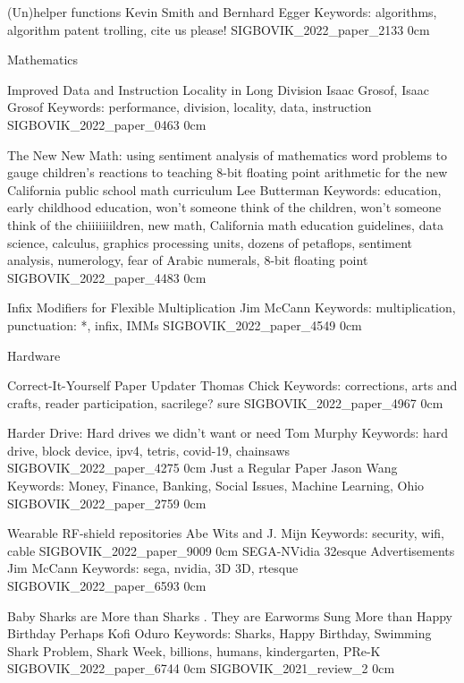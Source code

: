 \addpaper
    {(Un)helper functions}
    {Kevin Smith and Bernhard Egger}
    {Keywords: algorithms, algorithm patent trolling, cite us please!}
    {SIGBOVIK_2022_paper_2133}
    {0cm}
    {}

\addtrack
    {}{Mathematics}

\addpaper
    {Improved Data and Instruction Locality in Long Division}
    {Isaac Grosof, Isaac Grosof}
    {Keywords: performance, division, locality, data, instruction}
    {SIGBOVIK_2022_paper_0463}
    {0cm}
    {}

\addpaper
    {The New New Math: using sentiment analysis of mathematics word problems to gauge children's reactions to teaching 8-bit floating point arithmetic for the new California public school math curriculum}
    {Lee Butterman}
    {Keywords: education, early childhood education, won't someone think of the children, won't someone think of the chiiiiiiildren, new math, California math education guidelines, data science, calculus, graphics processing units, dozens of petaflops, sentiment analysis, numerology, fear of Arabic numerals, 8-bit floating point}
    {SIGBOVIK_2022_paper_4483}
    {0cm}
    {}

\addpaper
    {Infix Modifiers for Flexible Multiplication}
    {Jim McCann}
    {Keywords: multiplication, punctuation: *, infix, IMMs}
    {SIGBOVIK_2022_paper_4549}
    {0cm}
    {}

\addtrack
    {}{Hardware}

\addpaper
    {Correct-It-Yourself Paper Updater}
    {Thomas Chick}
    {Keywords: corrections, arts and crafts, reader participation, sacrilege? sure}
    {SIGBOVIK_2022_paper_4967}
    {0cm}
    {}

\addpaper
    {Harder Drive: Hard drives we didn't want or need}
    {Tom Murphy}
    {Keywords: hard drive, block device, ipv4, tetris, covid-19, chainsaws}
    {SIGBOVIK_2022_paper_4275}
    {0cm}
    {}
\addpaper
    {Just a Regular Paper}
    {Jason Wang}
    {Keywords: Money, Finance, Banking, Social Issues, Machine Learning, Ohio}
    {SIGBOVIK_2022_paper_2759}
    {0cm}
    {}


\addpaper
    {Wearable RF-shield repositories}
    {Abe Wits and J. Mijn}
    {Keywords: security, wifi, cable}
    {SIGBOVIK_2022_paper_9009}
    {0cm}
    {}
\addpaper
    {SEGA-NVidia 32esque Advertisements}
    {Jim McCann}
    {Keywords: sega, nvidia, 3D 3D, rtesque}
    {SIGBOVIK_2022_paper_6593}
    {0cm}
    {}


\addpaper
    {Baby Sharks are More than Sharks . They are Earworms Sung More than Happy Birthday Perhaps}
    {Kofi Oduro}
    {Keywords: Sharks, Happy Birthday, Swimming Shark Problem, Shark Week, billions, humans, kindergarten, PRe-K}
    {SIGBOVIK_2022_paper_6744}
    {0cm}
    {}
\addreview
    {SIGBOVIK_2021_review_2}
    {0cm}


